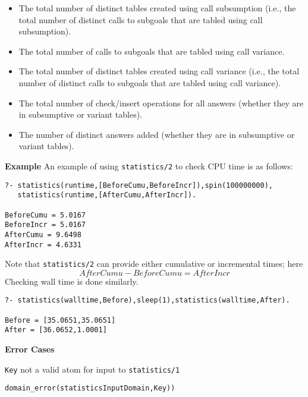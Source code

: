 \begin{description}
\begin{itemize}
\item The total number of distinct tables created using call
 subsumption (i.e., the total number of distinct calls to subgoals
 that are tabled using call subsumption).

\item The total number of calls to subgoals that are
 tabled using call variance.

\item The total number of distinct tables created using call
 variance (i.e., the total number of distinct calls to subgoals
 that are tabled using call variance).

\item The total number of check/insert operations for all answers
 (whether they are in subsumptive or variant tables).

\item The number of distinct answers added (whether they are in
 subsumptive or variant tables).
\end{itemize}
%
\ei

{\bf Example}
An example of using {\tt statistics/2} to check CPU time is as follows:

\begin{verbatim}
?- statistics(runtime,[BeforeCumu,BeforeIncr]),spin(100000000),
   statistics(runtime,[AfterCumu,AfterIncr]).

BeforeCumu = 5.0167
BeforeIncr = 5.0167
AfterCumu = 9.6498
AfterIncr = 4.6331
\end{verbatim}
Note that {\tt statistics/2} can provide either cumulative or
 incremental times; here
\[
 AfterCumu - BeforeCumu = AfterIncr
\]
Checking wall time is done similarly.
\begin{verbatim}
?- statistics(walltime,Before),sleep(1),statistics(walltime,After).

Before = [35.0651,35.0651]
After = [36.0652,1.0001]
\end{verbatim}

{\bf Error Cases}
\bi
\item {\tt Key} not a valid atom for input to {\tt statistics/1} 
\bi
\item 	{\tt domain\_error(statisticsInputDomain,Key))}
\ei
\ei


\comment{ 
%
%

}
\end{description}
